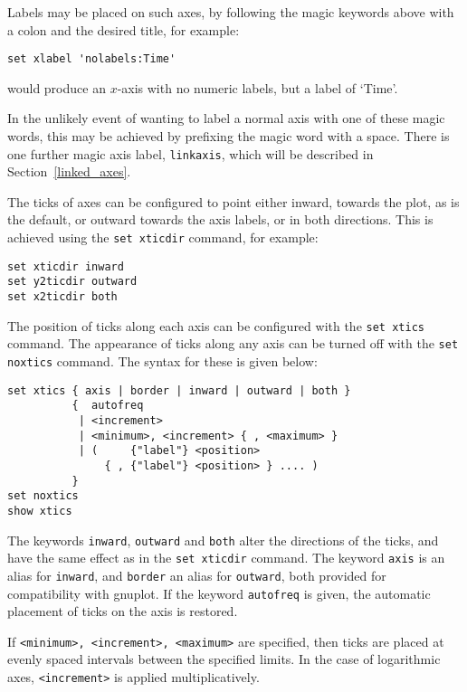 Labels may be placed on such axes, by following the magic keywords above with a
colon and the desired title, for example:

\begin{verbatim}
set xlabel 'nolabels:Time'
\end{verbatim}

\noindent would produce an $x$-axis with no numeric labels, but a label of
`Time'.

In the unlikely event of wanting
to label a normal axis with one of these magic words, this may be achieved by prefixing the magic
word with a space. There is one further magic axis label, {\tt linkaxis},
which will be described in Section~\ref{linked_axes}.

The ticks of axes can be configured to point either inward, towards the plot,
as is the default, or outward towards the axis labels, or in both directions.
This is achieved using the {\tt set xticdir} command, for example:

\begin{verbatim}
set xticdir inward
set y2ticdir outward
set x2ticdir both
\end{verbatim}

The position of ticks along each axis can be configured with the {\tt set
xtics} command. The
appearance of ticks along any axis can be turned off with the {\tt set
noxtics} command. The
syntax for these is given below:

\begin{verbatim}
set xtics { axis | border | inward | outward | both }
          {  autofreq
           | <increment>
           | <minimum>, <increment> { , <maximum> }
           | (     {"label"} <position>
               { , {"label"} <position> } .... )
          }
set noxtics
show xtics
\end{verbatim}

The keywords {\tt inward}, {\tt outward} and {\tt both} alter the
directions of the ticks, and have the same effect as in the {\tt set
xticdir} command. The keyword {\tt axis} is an alias for {\tt inward},
and {\tt border} an alias for {\tt outward}, both provided for
compatibility with gnuplot. If the keyword {\tt autofreq} is given, the automatic
placement of ticks on the axis is restored.

If {\tt <minimum>, <increment>, <maximum>} are specified, then ticks are
placed at evenly spaced intervals between the specified limits. In the case of
logarithmic axes, {\tt <increment>} is applied multiplicatively.

